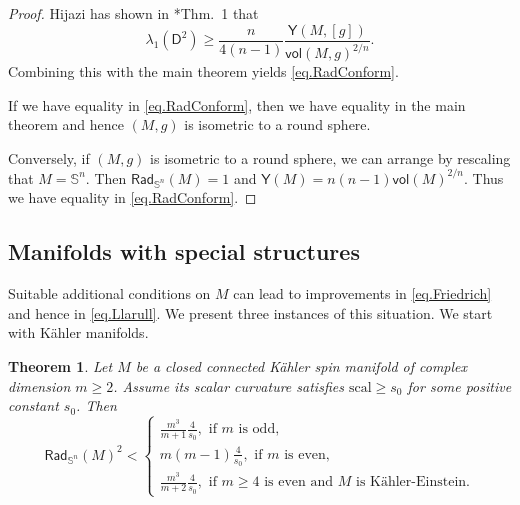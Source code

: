 \documentclass[11pt,reqno]{amsart}
\newcommand{\RadSn}{\mathsf{Rad}_{\Sn}}
\newcommand{\Sn}{\mathbb{S}^n}
\newcommand{\D}{\mathsf{D}}
\newcommand{\Y}{\mathsf{Y}}
\newcommand{\scal}{\mathrm{scal}}
\newcommand{\<}{\langle}
\renewcommand{\>}{\rangle}
\newcommand{\vol}{\mathsf{vol}}
\newtheorem{theorem}{Theorem}
\theoremstyle{definition}
\begin{document}
\begin{proof}
Hijazi has shown in \cite{H}*{Thm.~1} that 
$$
\lambda_1(\D^2) \ge \frac{n}{4(n-1)}\frac{\Y(M,[g])}{\vol(M,g)^{2/n}} .
$$
Combining this with the main theorem yields \eqref{eq.RadConform}.

If we have equality in \eqref{eq.RadConform}, then we have equality in the main theorem and hence $(M,g)$ is isometric to a round sphere.

Conversely, if $(M,g)$ is isometric to a round sphere, we can arrange by rescaling that $M=\Sn$.
Then $\RadSn(M)=1$ and $\Y(M)=n(n-1)\vol(M)^{2/n}$.
Thus we have equality in \eqref{eq.RadConform}.
\end{proof}



\subsection{Manifolds with special structures}
Suitable additional conditions on $M$ can lead to improvements in \eqref{eq.Friedrich} and hence in \eqref{eq.Llarull}.
We present three instances of this situation.
We start with Kähler manifolds.

\begin{theorem}
Let $M$ be a closed connected Kähler spin manifold of complex dimension $m\ge2$.
Assume its scalar curvature satisfies $\scal\ge s_0$ for some positive constant $s_0$.
Then
$$
\RadSn(M)^2 <
\begin{cases}
\frac{m^3}{m+1}\frac{4}{s_0}, \text{ if $m$ is odd},\\
m(m-1)\frac{4}{s_0}, \text{ if $m$ is even},\\
\frac{m^3}{m+2}\frac{4}{s_0}, \text{ if $m\ge4$ is even and $M$ is Kähler-Einstein}.
\end{cases}
$$
\end{theorem}
\end{document}
